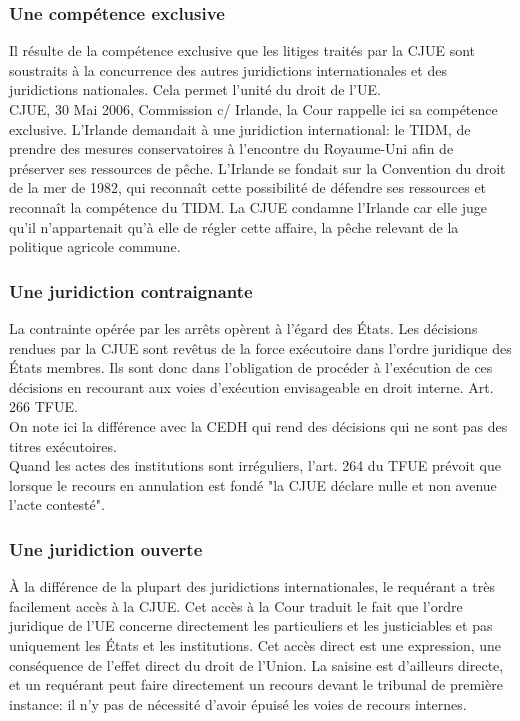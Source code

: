 \documentclass[10pt, a4paper, openany]{book}
\begin{document}
\subsubsection{Une compétence exclusive}

Il résulte de la compétence exclusive que les litiges traités par la CJUE sont soustraits à la concurrence des autres juridictions internationales et des juridictions nationales. Cela permet l'unité du droit de l'UE. \\
CJUE, 30 Mai 2006, Commission c/ Irlande, la Cour rappelle ici sa compétence exclusive. L'Irlande demandait à une juridiction international: le TIDM, de prendre des mesures conservatoires à l'encontre du Royaume-Uni afin de préserver ses ressources de pêche. L'Irlande se fondait sur la Convention du droit de la mer de 1982, qui reconnaît cette possibilité de défendre ses ressources et reconnaît la compétence du TIDM. La CJUE condamne l'Irlande car elle juge qu'il n'appartenait qu'à elle de régler cette affaire, la pêche relevant de la politique agricole commune. 

\subsubsection{Une juridiction contraignante}

La contrainte opérée par les arrêts opèrent à l'égard des États. Les décisions rendues par la CJUE sont revêtus de la force exécutoire dans l'ordre juridique des États membres. Ils sont donc dans l'obligation de procéder à l'exécution de ces décisions en recourant aux voies d'exécution envisageable en droit interne. Art. 266 TFUE. \\
On note ici la différence avec la CEDH qui rend des décisions qui ne sont pas des titres exécutoires. \\
Quand les actes des institutions sont irréguliers, l'art. 264 du TFUE prévoit que lorsque le recours en annulation est fondé "la CJUE déclare nulle et non avenue l'acte contesté". 

\subsubsection{Une juridiction ouverte}

À la différence de la plupart des juridictions internationales, le requérant a très facilement accès à la CJUE. Cet accès à la Cour traduit le fait que l'ordre juridique de l'UE concerne directement les particuliers et les justiciables et pas uniquement les États et les institutions. Cet accès direct est une expression, une conséquence de l'effet direct du droit de l'Union. La saisine est d'ailleurs directe, et un requérant peut faire directement un recours devant le tribunal de première instance: il n'y pas de nécessité d'avoir épuisé les voies de recours internes. 
\end{document}
